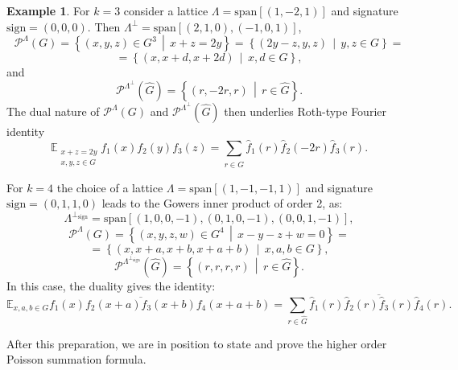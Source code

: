 \documentclass{amsart}
\theoremstyle{definition}
\newtheorem{example}[theorem]{Example}
\theoremstyle{remark}
\numberwithin{equation}{section}
\begin{document}

\if{}

\begin{example} For $k=3$ consider a lattice $\Lambda=\text{span}[(1,-2,1)]$ and signature $\mathrm{sign} = (0,0,0)$. Then $\Lambda^\perp=\text{span}[(2,1,0), (-1,0,1)]$, 
$$\mathcal{P}^{\Lambda}(G) = \left\{ (x, y, z) \in G^3 \, \middle| \, x+z=2y \right\} = \left\{ (2y - z, y, z) \, \middle| \, y,z \in G \right\} =$$ $$= \left\{ (x, x+d, x+2d) \, \middle| \, x,d \in G \right\}, $$ 
and 
$$\mathcal{P}^{\Lambda^\perp}(\widehat{G}) =  \left\{ (r, -2r, r) \, \middle| \, r \in \widehat{G} \right\}.$$ 
The dual nature of $\mathcal{P}^{\Lambda}(G)$ and $\mathcal{P}^{\Lambda^\perp}(\widehat{G})$ then underlies Roth-type Fourier identity
$$  \mathbb{E}_{\substack{x+z=2y \\x,y,z\in G}} f_1(x)f_2(y)f_3(z) = \sum_{r \in \widehat{G}} \widehat{f}_1 (r) \widehat{f}_2 (-2r) \widehat{f}_3 (r).$$ 

For $k=4$ the choice of a lattice $\Lambda=\text{span}[(1,-1,-1,1)]$ and signature $\mathrm{sign} = (0,1,1,0)$ leads to the Gowers inner product of order 2, as:  
$$\Lambda^{\perp_{\mathrm{sign}}} = \text{span}[(1,0,0,-1), (0,1,0,-1), (0,0,1,-1)],$$
$$\mathcal{P}^{\Lambda}(G) = \left\{ (x, y, z, w) \in G^4 \, \middle| \, x-y-z+w =0 \right\} =$$ $$= \left\{ (x, x+a, x+b, x+a+b) \, \middle| \, x,a,b \in G \right\}, $$ 
$$\mathcal{P}^{\Lambda^{\perp_{\mathrm{sign}}}}(\widehat{G}) =  \left\{ (r, r, r, r) \, \middle| \, r \in \widehat{G} \right\}.$$ In this case, the duality gives the identity:
$$  \mathbb{E}_{x,a,b\in G} f_1(x)\overline{f_2(x+a) f_3(x+b)}f_4(x+a+b) = \sum_{r \in \widehat{G}} \widehat{f}_1 (r) \overline{\widehat{f}_2 (r) \widehat{f}_3 (r) }\widehat{f}_4(r).$$
\end{example}

\fi{}

After this preparation, we are in position to state and prove the higher order Poisson summation formula.
 
\end{document}
